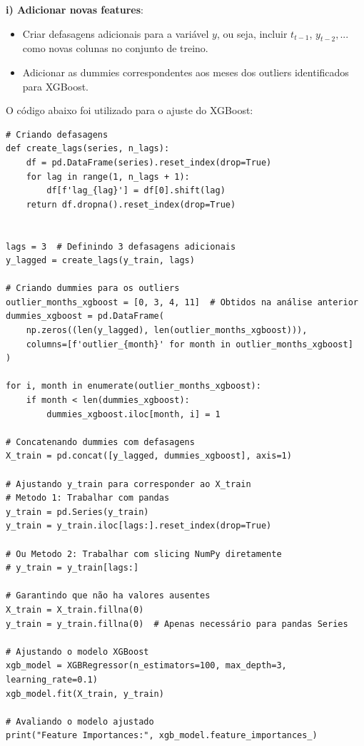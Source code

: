 \documentclass[a4paper, 12pt]{article}
\begin{document}
\textbf{i) Adicionar novas features}:\\
\begin{itemize}
    \item Criar defasagens adicionais para a variável $y$, ou seja, incluir $t_{t-1}$, $y_{t-2}, ...$ como novas colunas no conjunto de treino.
    \item Adicionar as dummies correspondentes aos meses dos outliers identificados para XGBoost.
\end{itemize}

O código abaixo foi utilizado para o ajuste do XGBoost:

\begin{lstlisting}[style=python]
    # Criando defasagens
def create_lags(series, n_lags):
    df = pd.DataFrame(series).reset_index(drop=True)
    for lag in range(1, n_lags + 1):
        df[f'lag_{lag}'] = df[0].shift(lag)
    return df.dropna().reset_index(drop=True)


lags = 3  # Definindo 3 defasagens adicionais
y_lagged = create_lags(y_train, lags)

# Criando dummies para os outliers
outlier_months_xgboost = [0, 3, 4, 11]  # Obtidos na análise anterior
dummies_xgboost = pd.DataFrame(
    np.zeros((len(y_lagged), len(outlier_months_xgboost))),
    columns=[f'outlier_{month}' for month in outlier_months_xgboost]
)

for i, month in enumerate(outlier_months_xgboost):
    if month < len(dummies_xgboost):
        dummies_xgboost.iloc[month, i] = 1

# Concatenando dummies com defasagens
X_train = pd.concat([y_lagged, dummies_xgboost], axis=1)

# Ajustando y_train para corresponder ao X_train
# Metodo 1: Trabalhar com pandas
y_train = pd.Series(y_train)  
y_train = y_train.iloc[lags:].reset_index(drop=True)

# Ou Metodo 2: Trabalhar com slicing NumPy diretamente
# y_train = y_train[lags:]

# Garantindo que não ha valores ausentes
X_train = X_train.fillna(0)
y_train = y_train.fillna(0)  # Apenas necessário para pandas Series

# Ajustando o modelo XGBoost
xgb_model = XGBRegressor(n_estimators=100, max_depth=3, learning_rate=0.1)
xgb_model.fit(X_train, y_train)

# Avaliando o modelo ajustado
print("Feature Importances:", xgb_model.feature_importances_)
\end{lstlisting}
\end{document}

